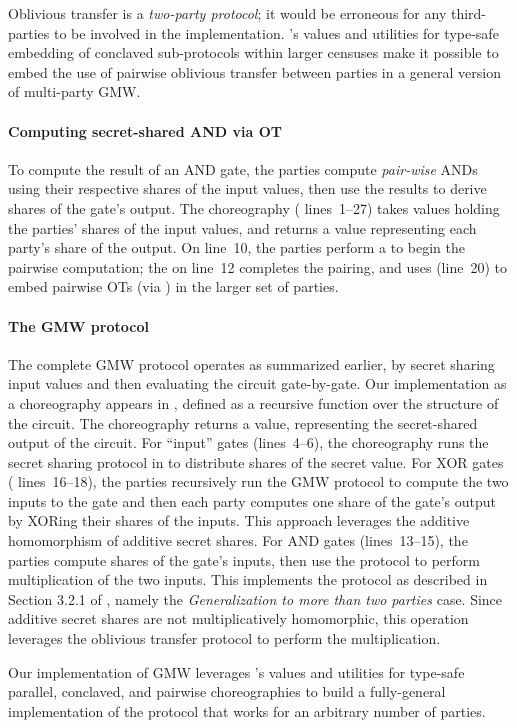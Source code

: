 Oblivious transfer is a \emph{two-party protocol}; it would be erroneous for any third-parties to be involved in the implementation.
\MultiChor's  values and utilities for type-safe embedding of conclaved sub-protocols within larger censuses
make it possible to embed the use of pairwise oblivious transfer between parties in a general version of multi-party GMW.

\paragraph{Computing secret-shared AND via OT}
To compute the result of an AND gate, the parties compute \emph{pair-wise} ANDs using their respective shares of the input values,
then use the results to derive shares of the gate's output.
The  choreography ( lines~1--27)
takes  values holding the parties' shares of the input values,
and returns a  value representing each party's share of the output.
On line~10, the parties perform a  to begin the pairwise computation;
the  on line~12 completes the pairing,
and uses  (line~20) to embed pairwise OTs (via ) in the larger set of parties.

\paragraph{The GMW protocol}
The complete GMW protocol operates as summarized earlier, by secret sharing input values and then evaluating the circuit gate-by-gate.
Our implementation as a \MultiChor choreography appears in ,
defined as a recursive function over the structure of the circuit.
The choreography returns a  value, representing the secret-shared output of the circuit.
For ``input'' gates (lines~4--6), the choreography runs the secret sharing protocol in 
to distribute shares of the secret value.
For XOR gates ( lines~16--18),
the parties recursively run the GMW protocol to compute the two inputs to the gate
and then each party computes one share of the gate's output by XORing their shares of the inputs.
This approach leverages the additive homomorphism of additive secret shares.
For AND gates (lines~13--15), the parties compute shares of the gate's inputs,
then use the  protocol to perform multiplication of the two inputs.
This implements the protocol as described in  Section 3.2.1 of \cite{evans2018pragmatic},
namely the \emph{Generalization to more than two parties} case.
Since additive secret shares are not multiplicatively homomorphic,
this operation leverages the oblivious transfer protocol to perform the multiplication.

Our implementation of GMW leverages \MultiChor's  values
and utilities for type-safe parallel, conclaved, and pairwise choreographies to build a fully-general implementation
of the protocol that works for an arbitrary number of parties.



